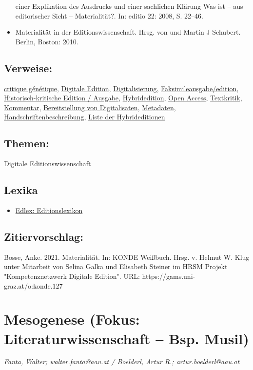 \documentclass{article}
\begin{document}
\begin{itemize}
                              einer Explikation des Ausdrucks und einer sachlichen Klärung Was ist – aus editorischer Sicht –
                              Materialität?. In: editio 22: 2008, S. 22–46.\item Materialität in der Editionswissenschaft. Hrsg. von  und Martin J Schubert. Berlin, Boston: 2010.\end{itemize}\subsection*{Verweise:}\href{https://gams.uni-graz.at/o:konde.46}{critique génétique}, \href{https://gams.uni-graz.at/o:konde.59}{Digitale Edition}, \href{https://gams.uni-graz.at/o:konde.60}{Digitalisierung}, \href{https://gams.uni-graz.at/o:konde.83}{Faksimileausgabe/edition}, \href{https://gams.uni-graz.at/o:konde.93}{Historisch-kritische Edition /
                           Ausgabe}, \href{https://gams.uni-graz.at/o:konde.96}{Hybridedition}, \href{https://gams.uni-graz.at/o:konde.152}{Open Access}, \href{https://gams.uni-graz.at/o:konde.192}{Textkritik}, \href{https://gams.uni-graz.at/o:konde.34}{Kommentar}, \href{https://gams.uni-graz.at/o:konde.36}{Bereitstellung von Digitalisaten}, \href{https://gams.uni-graz.at/o:konde.25}{Metadaten}, \href{https://gams.uni-graz.at/o:konde.92}{Handschriftenbeschreibung}, \href{https://gams.uni-graz.at/o:konde.117}{Liste der Hybrideditionen}\subsection*{Themen:}Digitale Editionswissenschaft\subsection*{Lexika}\begin{itemize}\item \href{https://edlex.de/index.php?title=Materialit%C3%A4t}{Edlex: Editionslexikon}\end{itemize}\subsection*{Zitiervorschlag:}Bosse, Anke. 2021. Materialität. In: KONDE Weißbuch. Hrsg. v. Helmut W. Klug unter Mitarbeit von Selina Galka und Elisabeth Steiner im HRSM Projekt "Kompetenznetzwerk Digitale Edition". URL: https://gams.uni-graz.at/o:konde.127\newpage\section*{Mesogenese (Fokus: Literaturwissenschaft – Bsp. Musil)} \emph{Fanta, Walter; walter.fanta@aau.at / Boelderl, Artur R.;
                  artur.boelderl@aau.at}\\
        
\end{document}
